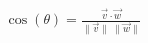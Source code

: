 \documentclass[preview]{standalone}
\begin{document}
\begin{align*}
\cos(\theta)=\frac{\vec v\cdot \vec w}{\lVert \vec v\rVert\;\lVert \vec w\rVert}
\end{align*}
\end{document}

